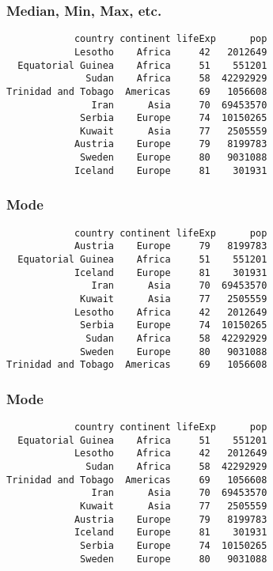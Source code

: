 \documentclass[17pt]{beamer} %
\begin{document}
\begin{frame}[fragile]
\frametitle{Median, Min, Max, etc.}
\footnotesize
\begin{verbatim}
            country continent lifeExp      pop
            Lesotho    Africa     42   2012649
  Equatorial Guinea    Africa     51    551201
              Sudan    Africa     58  42292929
Trinidad and Tobago  Americas     69   1056608
               Iran      Asia     70  69453570
             Serbia    Europe     74  10150265
             Kuwait      Asia     77   2505559
            Austria    Europe     79   8199783
             Sweden    Europe     80   9031088
            Iceland    Europe     81    301931
\end{verbatim}
\end{frame}



\begin{frame}[fragile]
\frametitle{Mode}
\footnotesize
\begin{verbatim}
            country continent lifeExp      pop
            Austria    Europe     79   8199783
  Equatorial Guinea    Africa     51    551201
            Iceland    Europe     81    301931
               Iran      Asia     70  69453570
             Kuwait      Asia     77   2505559
            Lesotho    Africa     42   2012649
             Serbia    Europe     74  10150265
              Sudan    Africa     58  42292929
             Sweden    Europe     80   9031088
Trinidad and Tobago  Americas     69   1056608
\end{verbatim}
\end{frame}

\begin{frame}[fragile]
\frametitle{Mode}
\footnotesize
\begin{verbatim}
            country continent lifeExp      pop
  Equatorial Guinea    Africa     51    551201
            Lesotho    Africa     42   2012649
              Sudan    Africa     58  42292929
Trinidad and Tobago  Americas     69   1056608
               Iran      Asia     70  69453570
             Kuwait      Asia     77   2505559
            Austria    Europe     79   8199783
            Iceland    Europe     81    301931
             Serbia    Europe     74  10150265
             Sweden    Europe     80   9031088
\end{verbatim}
\end{frame}

\end{document}
